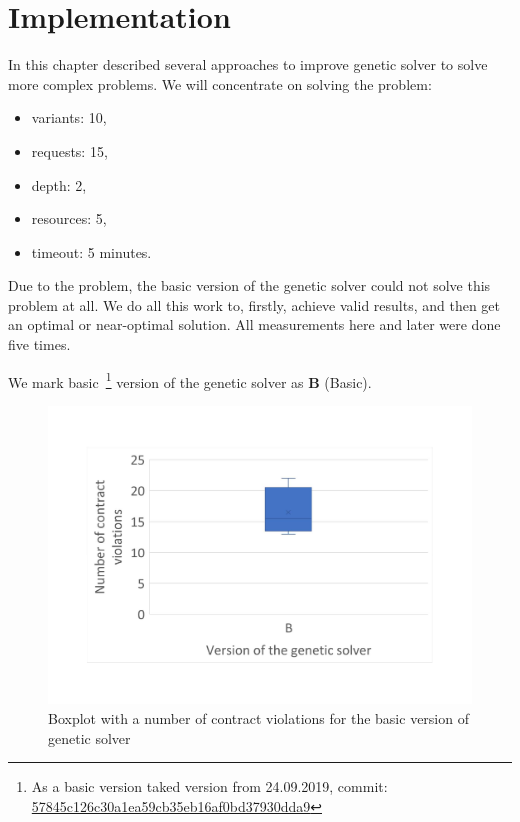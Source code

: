 \chapter{Implementation}\label{chapter:Implementation}

In this chapter described several approaches to improve genetic solver to solve more complex problems.
We will concentrate on solving the problem:

\begin{itemize}
	\item variants: 10,
	\item requests: 15,
	\item depth: 2,
	\item resources: 5,
	\item timeout: 5 minutes.
\end{itemize}

Due to the problem, the basic version of the genetic solver could not solve this problem at all. We do all this work to, firstly, achieve valid results, and then get an optimal or near-optimal solution. 
All measurements here and later were done five times.


We mark basic~\footnote{As a basic version taked version from 24.09.2019, commit: \href{https://git-st.inf.tu-dresden.de/mquat/mquat2/commit/57845c126c30a1ea59cb35eb16af0bd37930dda9}{57845c126c30a1ea59cb35eb16af0bd37930dda9}} version of the genetic solver as \textbf{B} (Basic).


\begin{figure}
	\centering
	\includegraphics[width=\textwidth]{images/BoxPlotSolverBasic}
	\caption[Boxplot with a number of contract violations for the basic version of genetic solver]{Boxplot with a number of contract violations for the basic version of genetic solver}
	\label{fig:boxplotsolverbasic}
\end{figure}


